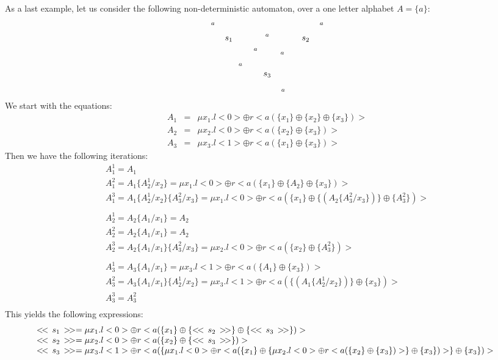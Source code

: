 \documentclass{LMCS}
\def\expr#1{<\!< \, #1 \, >\!>}
\def\hyph{-\penalty0\hskip0pt\relax}
\theoremstyle{definition}
\theoremstyle{plain}
\theoremstyle{plain}
\theoremstyle{plain}
\theoremstyle{plain}
\theoremstyle{definition}
\theoremstyle{definition}
\begin{document}
As a last example, let us consider the following non\hyph deterministic automaton, over a one letter alphabet $A=\{a\}$:
\[
\xymatrix{
*++[o][F]{s_1} \ar@(l,u)[]^{a}\ar@/^/[dr]^{a}\ar[rr]^{a}&& *++[o][F]{s_2}\ar@(r,u)[]_{a} \ar[dl]_{a} \\
&*++[o][F=]{s_3}\ar@(r,d)[]^{a}\ar@/^/[ul]^{a}&}
\]
We start with the equations:
\[
\begin{array}{lcl}
A_1&=&\mu x_1. l<0> \oplus r<a(\{x_1\} \oplus \{x_2\} \oplus \{x_3\})>\\
A_2&=&\mu x_2. l<0> \oplus r<a( \{x_2\} \oplus \{x_3\})>\\
A_3&=&\mu x_3. l<1> \oplus r<a(\{x_1\} \oplus \{x_3\})>
\end{array}
\]
Then we have the following iterations:
\[
\begin{array}{l}
A_1^1 = A_1\\[1ex]
A_1^2 = A_1 \{A_2^1/x_2\} = \mu x_1. l<0> \oplus r<a(\{x_1\} \oplus \{A_2\} \oplus \{x_3\})>\\[1ex]
A_1^3 = A_1 \{A_2^1/x_2\} \{A_3^2/x_3\} =  \mu x_1. l<0> \oplus r<a(\{x_1\} \oplus \{(A_2\{A_3^2/x_3\})\} \oplus \{A_3^2\})>\\
\\
A_2^1 =  A_2 \{A_1/x_1\} = A_2\\[1ex]
A_2^2 = A_2 \{A_1/x_1\} = A_2\\[1ex]
A_2^3 = A_2 \{A_1/x_1\}\{A_3^2/x_3\} = \mu x_2. l<0> \oplus r<a( \{x_2\} \oplus \{A_3^2\})>\\
\\
A_3^1 = A_3  \{A_1/x_1\} = \mu x_3. l<1> \oplus r<a(\{A_1\} \oplus \{x_3\})>\\[1ex]
A_3^2 = A_3  \{A_1/x_1\}\{A_2^1/x_2\} = \mu x_3. l<1> \oplus r<a(\{(A_1\{A_2^1/x_2\}) \} \oplus \{x_3\})>\\[1ex]
A_3^3 = A_3^2\\
\end{array}
\]
This yields the following expressions:
{\small
\[
\begin{array}{@{}l}
\expr{s_1} =  \mu x_1. l<0> \oplus r<a(\{x_1\} \oplus \{\expr{s_2}\} \oplus \{\expr{s_3}\})>\\
\expr{s_2} = \mu x_2. l<0> \oplus r<a( \{x_2\} \oplus \{\expr{s_3}\})>\\ 
\expr{s_3} = \mu x_3. l<1> \oplus r<a(\{ \mu x_1. l<0> \oplus r<a(\{x_1\} \oplus \{\mu x_2. l<0> \oplus r<a( \{x_2\} \oplus \{x_3\})>\} \oplus \{x_3\})> \} \oplus \{x_3\})>\\
\end{array}
\]
}
\end{document}
